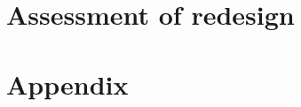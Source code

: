 \documentclass[a4paper, 11pt]{scrartcl}
\begin{document}







\section{Assessment of redesign}






\newpage
\clearpage
\section{Appendix}
\end{document}
